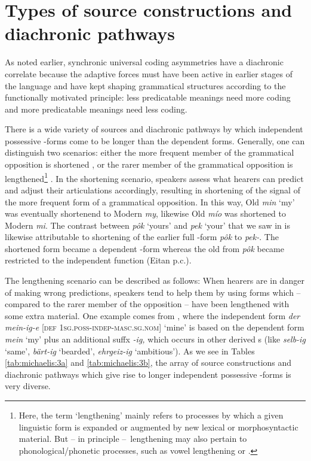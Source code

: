 \documentclass[output=paper]{langsci/langscibook}
\begin{document}
\section{Types of source constructions and diachronic pathways}\label{sec:michaelis:3}

As noted earlier, synchronic universal coding asymmetries have a diachronic correlate because the adaptive forces must have been active in earlier stages of the language and have kept shaping grammatical structures according to the functionally motivated  principle: less predicatable meanings need more coding and more predicatable meanings need less coding.

There is a wide variety of sources and diachronic pathways by which independent possessive -forms come to be longer than the dependent forms. Generally, one can distinguish two scenarios: either the more frequent member of the grammatical opposition is shortened \citep{Bybee2007}, or the rarer member of the grammatical opposition is lengthened\footnote{Here, the term ‘lengthening’ mainly refers to processes by which a given linguistic form is expanded or augmented by new lexical or morphosyntactic material. But – in principle –~lengthening may also pertain to phonological/phonetic processes, such as vowel lengthening or .} \citep{Haspelmath2008_Econ}. In the shortening scenario, speakers assess what hearers can predict and adjust their articulations accordingly, resulting in shortening of the signal of the more frequent form of a grammatical opposition. In this way, Old  \textit{min} ‘my’ was eventually shortenend to Modern  \textit{my}, likewise Old  \textit{mío} was shortened to Modern  \textit{mi}. The  contrast between \textit{pôk} ‘yours’ and \textit{pek} ‘your’ that we saw in  is likewise attributable to shortening of the earlier full -form \textit{pôk} to \textit{pek-}. The shortened form became a dependent -form whereas the old from \textit{pôk} became restricted to the independent function (Eitan  p.c.).

The lengthening scenario can be described as follows: When hearers are in danger of making wrong predictions, speakers tend to help them by using forms which – compared to the rarer member of the opposition – have been lengthened with some extra material. One example comes from , where the independent form \textit{der mein-ig-e} [\textsc{def} \textsc{1sg.poss-indep-masc.sg.nom}] ‘mine’ is based on the dependent form \textit{mein} ‘my’ plus an additional suffx \textit{{}-ig,} which occurs in other derived s (like \textit{selb-ig} ‘same’, \textit{bärt-ig} ‘bearded’, \textit{ehrgeiz-ig} ‘ambitious’). As we see in Tables \ref{tab:michaelis:3a} and \ref{tab:michaelis:3b}, the array of source constructions and diachronic pathways which give rise to longer independent possessive -forms is very diverse.
\end{document}
